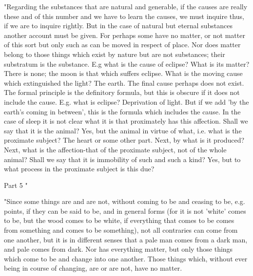 "Regarding the substances that are natural and generable, if the causes
are really these and of this number and we have to learn the causes,
we must inquire thus, if we are to inquire rightly. But in the case
of natural but eternal substances another account must be given. For
perhaps some have no matter, or not matter of this sort but only such
as can be moved in respect of place. Nor does matter belong to those
things which exist by nature but are not substances; their substratum
is the substance. E.g what is the cause of eclipse? What is its matter?
There is none; the moon is that which suffers eclipse. What is the
moving cause which extinguished the light? The earth. The final cause
perhaps does not exist. The formal principle is the definitory formula,
but this is obscure if it does not include the cause. E.g. what is
eclipse? Deprivation of light. But if we add 'by the earth's coming
in between', this is the formula which includes the cause. In the
case of sleep it is not clear what it is that proximately has this
affection. Shall we say that it is the animal? Yes, but the animal
in virtue of what, i.e. what is the proximate subject? The heart or
some other part. Next, by what is it produced? Next, what is the affection-that
of the proximate subject, not of the whole animal? Shall we say that
it is immobility of such and such a kind? Yes, but to what process
in the proximate subject is this due? 

Part 5 "

"Since some things are and are not, without coming to be and ceasing
to be, e.g. points, if they can be said to be, and in general forms
(for it is not 'white' comes to be, but the wood comes to be white,
if everything that comes to be comes from something and comes to be
something), not all contraries can come from one another, but it is
in different senses that a pale man comes from a dark man, and pale
comes from dark. Nor has everything matter, but only those things
which come to be and change into one another. Those things which,
without ever being in course of changing, are or are not, have no
matter. 

